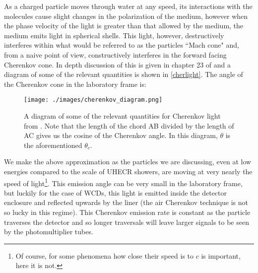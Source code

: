 As a charged particle moves through water at any speed, its interactions with the molecules cause slight changes in the polarization of the medium, however when the phase velocity of the light is greater than that allowed by the medium, the medium emits light in spherical shells. This light, however, destructively interferes within what would be referred to as the particles ``Mach cone" and, from a naive point of view, constructively interferes in the forward facing Cherenkov cone. In depth discussion of this is given in chapter 23 of  and a diagram of some of the relevant quantities is shown in \autoref{cherlight}. The angle of the Cherenkov cone in the laboratory frame is:
\begin{figure}[h!]
\begin{center}
\texttt{[image: ./images/cherenkov\_diagram.png]}
\caption[Cherenkov Light Diagram]{A diagram of some of the relevant quantities for Cherenkov light from \cite{cherbaki}. Note that the length of the chord AB divided by the length of AC gives us the cosine of the Cherenkov angle. In this diagram, $\theta$ is the aforementioned $\theta_c$.}
\label{cherlight}
\end{center}
\end{figure}
We make the above approximation as the particles we are discussing, even at low energies compared to the scale of UHECR showers, are moving at very nearly the speed of light\footnote{Of course, for some phenomena how close their speed is to $c$ is important, here it is not.}. This emission angle can be very small in the laboratory frame, but luckily for the case of WCDs, this light is emitted inside the detector enclosure and reflected upwards by the liner (the air Cherenkov technique is not so lucky in this regime). This Cherenkov emission rate is constant as the particle traverses the detector and so longer traversals will leave larger signals to be seen by the photomultiplier tubes.

